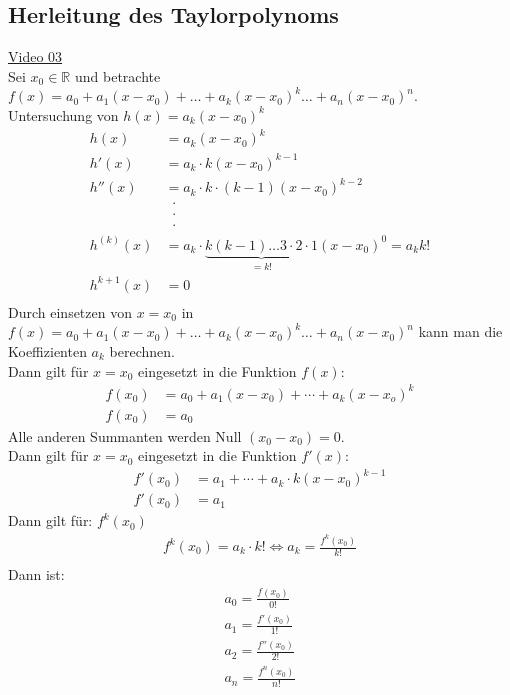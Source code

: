 \subsection{ Herleitung des Taylorpolynoms}
\href{https://youtu.be/EFkwp2qckNU}{Video 03}\\
Sei $ x_0\in\mathbb{R} $ und betrachte $ f(x)=a_0+a_1(x-x_0)+\ldots+a_k(x-x_0)^k\ldots+a_n(x-x_0)^n $.\vspace*{4mm}\\
Untersuchung von $ h(x)=a_k(x-x_0)^k $\\
\begin{align*}
h(x)&=a_k(x-x_0)^k\\
h'(x)&=a_k\cdot k(x-x_0)^{k-1}\\
h''(x)&=a_k\cdot k\cdot (k-1)(x-x_0)^{k-2}\\
&\;\;\cdot\\
&\;\;\cdot\\
&\;\;\cdot\\
h^{(k)}(x)&=a_k\cdot \underbrace {k(k-1)\ldots 3\cdot 2 \cdot 1}_{=k!}(x-x_0)^0=a_k k!\\
h^{k+1}(x)&=0\\
\end{align*}
Durch einsetzen von $ x=x_0 $ in $ f(x) =a_0+a_1(x-x_0)+\ldots+a_k(x-x_0)^k\ldots+a_n(x-x_0)^n$ kann man die Koeffizienten $ a_k $ berechnen.\\
Dann gilt für $ x=x_0 $ eingesetzt in die Funktion $ f(x) $:\\
\begin{align*}
f(x_0)&=a_0+a_1(x-x_0)+\cdots +a_k(x-x_o)^k\\
f(x_0)&=a_0
\end{align*}
Alle anderen Summanten werden Null $ (x_0-x_0)=0 $.\vspace*{2mm}\\
Dann gilt für $ x=x_0 $ eingesetzt in die Funktion $ f'(x) $:\\
\begin{align*}
f'(x_0)&=a_1+\cdots+a_k\cdot k(x-x_0)^{k-1}\\
f'(x_0)&=a_1
\end{align*}
Dann gilt für: $ f^k(x_0) $
\begin{align*}
f^k (x_0)=a_k\cdot k!\Leftrightarrow a_k=\frac{f^k(x_0)}{k!}\\
\end{align*}
Dann ist:\\
\begin{align*}
a_0=\frac{f(x_0)}{0!}\\
a_1=\frac{f'(x_0)}{1!}\\
a_2=\frac{f''(x_0)}{2!}\\
a_n=\frac{f^n(x_0)}{n!}\\
\end{align*}
